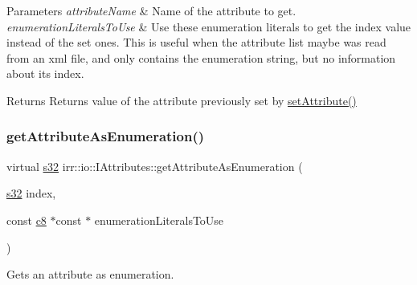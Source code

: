 \begin{DoxyParams}{Parameters}
{\em attribute\+Name} & Name of the attribute to get. \\
\hline
{\em enumeration\+Literals\+To\+Use} & Use these enumeration literals to get the index value instead of the set ones. This is useful when the attribute list maybe was read from an xml file, and only contains the enumeration string, but no information about its index. \\
\hline
\end{DoxyParams}
\begin{DoxyReturn}{Returns}
Returns value of the attribute previously set by \hyperlink{classirr_1_1io_1_1IAttributes_a03fa31acb481ae23678676cc183f09a6}{set\+Attribute()} 
\end{DoxyReturn}
\mbox{\label{classirr_1_1io_1_1IAttributes_a906b34ac742d3418d16afcf1d1e2aaa4}} 
\subsubsection{\texorpdfstring{get\+Attribute\+As\+Enumeration()}{getAttributeAsEnumeration()}\hspace{0.1cm}{\footnotesize\ttfamily [3/4]}}
{\footnotesize\ttfamily virtual \hyperlink{namespaceirr_ac66849b7a6ed16e30ebede579f9b47c6}{s32} irr\+::io\+::\+I\+Attributes\+::get\+Attribute\+As\+Enumeration (\begin{DoxyParamCaption}\item[{\hyperlink{namespaceirr_ac66849b7a6ed16e30ebede579f9b47c6}{s32}}]{index,  }\item[{const \hyperlink{namespaceirr_a9395eaea339bcb546b319e9c96bf7410}{c8} $\ast$const $\ast$}]{enumeration\+Literals\+To\+Use }\end{DoxyParamCaption})\hspace{0.3cm}{\ttfamily [pure virtual]}}



Gets an attribute as enumeration. 


